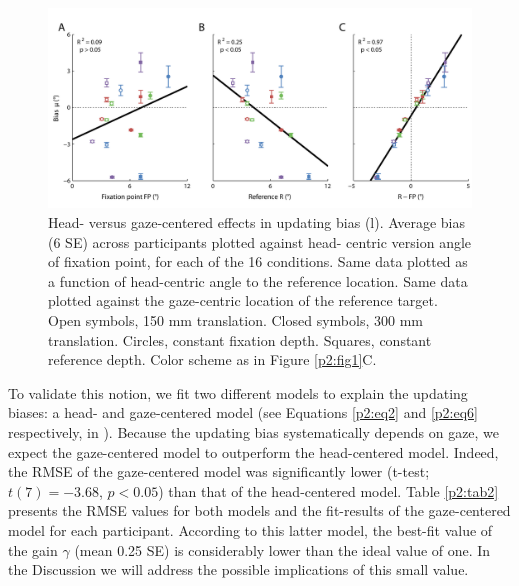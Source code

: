 \begin{figure}
    \includegraphics[width=1.0\textwidth]{src/paper2/figure4.pdf}
    
    \caption{Head- versus gaze-centered effects in updating bias (l).  Average bias (6 SE) across participants plotted against head- centric version angle of fixation point, for each of the 16 conditions.  Same data plotted as a function of head-centric angle to the reference location.  Same data plotted against the gaze-centric location of the reference target. Open symbols, 150 mm translation. Closed symbols, 300 mm translation. Circles, constant fixation depth. Squares, constant reference depth. Color scheme as in Figure \ref{p2:fig1}C.}
    
    \label{p2:fig4}
\end{figure}

To validate this notion, we fit two different models to explain the updating biases: a head- and gaze-centered model (see Equations \ref{p2:eq2} and \ref{p2:eq6} respectively, in ). Because the updating bias systematically depends on gaze, we expect the gaze-centered model to outperform the head-centered model. Indeed, the RMSE of the gaze-centered model was significantly lower (t-test; $t(7) = -3.68$, $p < 0.05$) than that of the head-centered model. Table \ref{p2:tab2} presents the RMSE values for both models and the fit-results of the gaze-centered model for each participant. According to this latter model, the best-fit value of the gain $\gamma$ (mean 0.25  SE) is considerably lower than the ideal value of one. In the Discussion we will address the possible implications of this small value.

